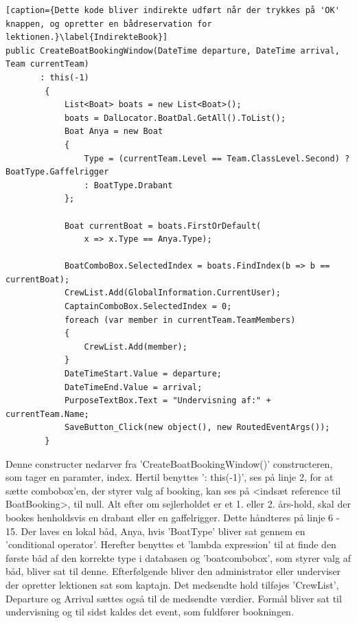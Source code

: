 \begin{lstlisting}[caption={Dette kode bliver indirekte udført når der trykkes på 'OK' knappen, og opretter en bådreservation for lektionen.}\label{IndirekteBook}]
public CreateBoatBookingWindow(DateTime departure, DateTime arrival, Team currentTeam) 
	   : this(-1)
        {
            List<Boat> boats = new List<Boat>();
            boats = DalLocator.BoatDal.GetAll().ToList();
            Boat Anya = new Boat
            {
                Type = (currentTeam.Level == Team.ClassLevel.Second) ? BoatType.Gaffelrigger 
                : BoatType.Drabant
            };

            Boat currentBoat = boats.FirstOrDefault(
                x => x.Type == Anya.Type);

            BoatComboBox.SelectedIndex = boats.FindIndex(b => b == currentBoat);
            CrewList.Add(GlobalInformation.CurrentUser);
            CaptainComboBox.SelectedIndex = 0;
            foreach (var member in currentTeam.TeamMembers)
            {
                CrewList.Add(member);
            }
            DateTimeStart.Value = departure;
            DateTimeEnd.Value = arrival;
            PurposeTextBox.Text = "Undervisning af:" + currentTeam.Name;
            SaveButton_Click(new object(), new RoutedEventArgs());
        }
\end{lstlisting}
Denne constructer nedarver fra 'CreateBoatBookingWindow()' constructeren, som tager en paramter, index. Hertil benyttes ': this(-1)', ses på linje 2, for at sætte combobox'en, der styrer valg af booking, kan ses på <indsæt reference til BoatBooking>, til null.
Alt efter om sejlerholdet er et 1. eller 2. års-hold, skal der bookes henholdsvis en drabant eller en gaffelrigger. Dette håndteres på linje 6 - 15. Der laves en lokal båd, Anya, hvis 'BoatType' bliver sat gennem en 'conditional operator'.
Herefter benyttes et 'lambda expression' til at finde den første båd af den korrekte type i databasen og 'boatcombobox', som styrer valg af båd, bliver sat til denne.
Efterfølgende bliver den administrator eller underviser der opretter lektionen sat som kaptajn. Det medsendte hold tilføjes 'CrewList', Departure og Arrival sættes også til de medsendte værdier. Formål bliver sat til undervisning og til sidst kaldes det event, som fuldfører bookningen.

\cbend
